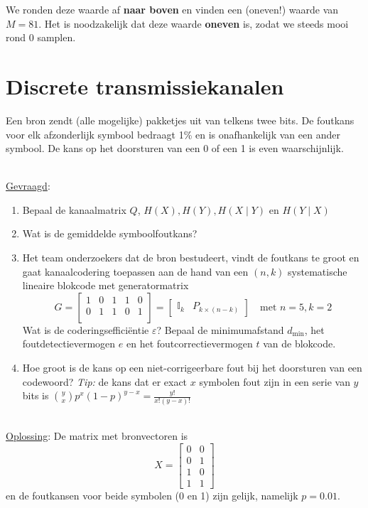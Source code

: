 \documentclass{kuburgiearticle}
\begin{document}
	We ronden deze waarde af \textbf{naar boven} en vinden een (oneven!) waarde van \(M=\boxed{81}\). Het is noodzakelijk dat deze waarde \textbf{oneven} is, zodat we steeds mooi rond 0 samplen.


	\newpage \section{Discrete transmissiekanalen}

	Een bron zendt (alle mogelijke) pakketjes uit van telkens twee bits. De foutkans voor elk afzonderlijk symbool bedraagt 1\% en is onafhankelijk van een ander symbool. De kans op het doorsturen van een 0 of een 1 is even waarschijnlijk.

	\hfill \\
	\underline{Gevraagd}:
	\begin{enumerate}
		\item Bepaal de kanaalmatrix \(Q\), \(H(X), H(Y), H(X\mid Y)\) en \(H(Y\mid X)\)
		\item Wat is de gemiddelde symboolfoutkans?
		\item Het team onderzoekers dat de bron bestudeert, vindt de foutkans te groot en gaat kanaalcodering toepassen aan de hand van een \((n,k)\) systematische lineaire blokcode met generatormatrix \[
		G=\begin{bmatrix}
		1 & 0 & 1 & 1 & 0 \\
		0 & 1 & 1 & 0 & 1 \\
		\end{bmatrix}=\begin{bmatrix}
		\mathbb{I}_{k} & P_{k\times (n-k)}
	\end{bmatrix} \quad \text{met } n=5, k=2\]Wat is de coderingsefficiëntie \(\varepsilon\)? Bepaal de minimumafstand \(d_{\text{min}}\), het foutdetectievermogen \(e\) en het foutcorrectievermogen \(t\) van de blokcode.
		\item Hoe groot is de kans op een niet-corrigeerbare fout bij het doorsturen van een codewoord? \textit{Tip:} de kans dat er exact \(x\) symbolen fout zijn in een serie van \(y\) bits is \(\binom{y}{x}p^x(1-p)^{y-x}=\frac{y!}{x!(y-x)!}\)
	\end{enumerate}

	\hfill \\
	\underline{Oplossing}:
	De matrix met bronvectoren is \[
	X=\begin{bmatrix}
		0 & 0 \\
		0 & 1 \\
		1 & 0 \\
		1 & 1
	\end{bmatrix}\]
	en de foutkansen voor beide symbolen (0 en 1) zijn gelijk, namelijk \(p=0.01\).
\end{document}
